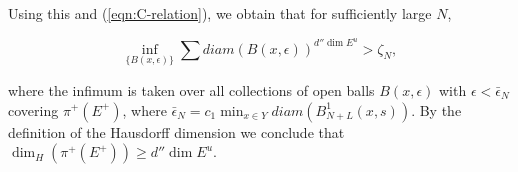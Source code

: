 \documentclass{amsart}
\theoremstyle{plain}
\theoremstyle{definition}
\theoremstyle{remark}
\numberwithin{equation}{section}
\begin{document}
Using this and (\ref{eqn:C-relation}), we obtain that for sufficiently large $N$,




\begin{equation}\label{eqn:haus-final}
\inf_{\{  B(x,\epsilon) \}    } \sum  diam(B(x,\epsilon))^{d'' \dim E^u} >     \zeta_N     ,    
\end{equation}

where the infimum is taken over all collections of open balls $B(x,\epsilon)$ with $\epsilon < \bar{\epsilon}_N$ covering $\pi^+(E^+)$, where $ \bar{\epsilon}_N= c_1\min_{x\in Y} diam( B_{N+L}^1(x,s)  )$.
By the definition of the Hausdorff dimension we conclude that $\dim_H(\pi^+(E^+) )  \geq d'' \dim E^u.  $
\end{document}
